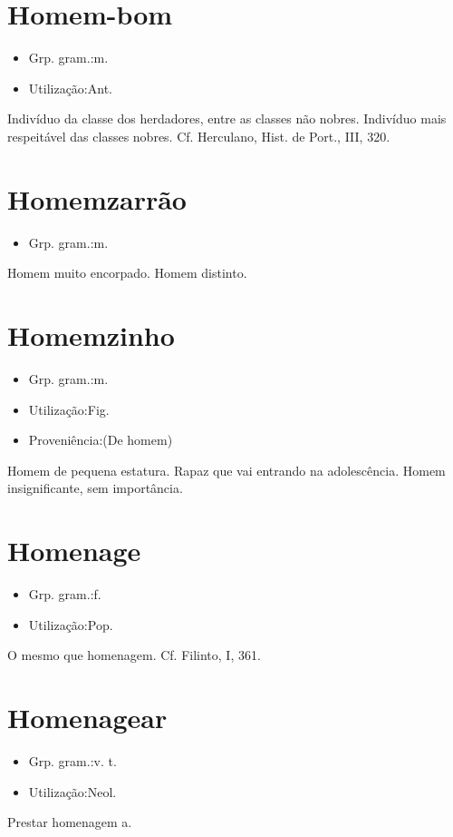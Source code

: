 \documentclass{article}
\begin{document}
\section{Homem-bom}
\begin{itemize}
\item {Grp. gram.:m.}
\end{itemize}
\begin{itemize}
\item {Utilização:Ant.}
\end{itemize}
Indivíduo da classe dos herdadores, entre as classes não nobres.
Indivíduo mais respeitável das classes nobres. Cf. Herculano, \textunderscore Hist. de Port.\textunderscore , III, 320.
\section{Homemzarrão}
\begin{itemize}
\item {Grp. gram.:m.}
\end{itemize}
Homem muito encorpado.
Homem distinto.
\section{Homemzinho}
\begin{itemize}
\item {Grp. gram.:m.}
\end{itemize}
\begin{itemize}
\item {Utilização:Fig.}
\end{itemize}
\begin{itemize}
\item {Proveniência:(De \textunderscore homem\textunderscore )}
\end{itemize}
Homem de pequena estatura.
Rapaz que vai entrando na adolescência.
Homem insignificante, sem importância.
\section{Homenage}
\begin{itemize}
\item {Grp. gram.:f.}
\end{itemize}
\begin{itemize}
\item {Utilização:Pop.}
\end{itemize}
O mesmo que \textunderscore homenagem\textunderscore . Cf. Filinto, I, 361.
\section{Homenagear}
\begin{itemize}
\item {Grp. gram.:v. t.}
\end{itemize}
\begin{itemize}
\item {Utilização:Neol.}
\end{itemize}
Prestar homenagem a.
\end{document}
